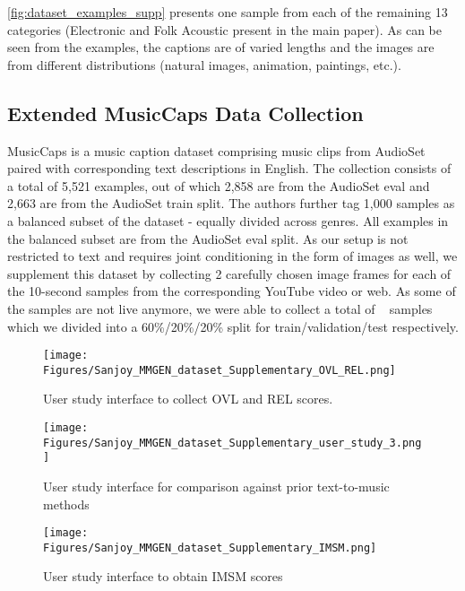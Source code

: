 \cref{fig:dataset_examples_supp} presents one sample from each of the remaining 13 categories (Electronic and Folk Acoustic present in the main paper). As can be seen from the examples, the captions are of varied lengths and the images are from different distributions (natural images, animation, paintings, etc.).

\subsection{Extended MusicCaps Data Collection}
MusicCaps \cite{musiclm} is a music caption dataset comprising music clips from AudioSet \cite{gemmeke2017audio} paired with corresponding text descriptions in English. The collection consists of a total of 5,521 examples, out of which 2,858 are from the AudioSet eval and 2,663 are from the AudioSet train split. The authors further tag 1,000 samples as a balanced subset of the dataset - equally divided across genres. All examples in the balanced subset are from the AudioSet eval split. As our setup is not restricted to text and requires joint conditioning in the form of images as well, we supplement this dataset by collecting 2 carefully chosen image frames for each of the 10-second samples from the corresponding YouTube video or web. As some of the samples are not live anymore, we were able to collect a total of \musiccapssamples~ samples which we divided into a 60\%/20\%/20\% split for train/validation/test respectively. 

\begin{figure}
    \centering
    \texttt{[image: Figures/Sanjoy\_MMGEN\_dataset\_Supplementary\_OVL\_REL.png]}
    \caption{User study interface to collect OVL and REL scores. }
    \label{fig:user-study_ovl_rel}
\end{figure}

\begin{figure}[!t]
    \centering
    \texttt{[image: Figures/Sanjoy\_MMGEN\_dataset\_Supplementary\_user\_study\_3.png]}
    \caption{User study interface for comparison against prior text-to-music methods}
    \label{fig:user-study-comparison}
\end{figure}

\begin{figure}
    \centering
    \texttt{[image: Figures/Sanjoy\_MMGEN\_dataset\_Supplementary\_IMSM.png]}
    \caption{User study interface to obtain IMSM scores}
    \label{fig:user-study_imsm}
\end{figure}

